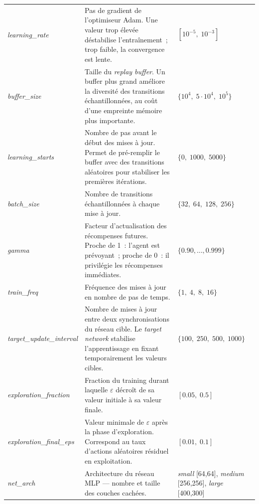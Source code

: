 \begin{longtable}{%
  p{\hpColA}%
  p{\dimexpr\textwidth - \hpColA - \hpColC - 6\tabcolsep\relax}%
  p{\hpColC}%
}
\textit{learning\_rate}
  & Pas de gradient de l'optimiseur Adam.
    Une valeur trop élevée déstabilise l'entraînement~; trop faible,
    la convergence est lente.
  & $[10^{-5},\;10^{-3}]$ \\[4pt]
\textit{buffer\_size}
  & Taille du \textit{replay buffer}.
    Un buffer plus grand améliore la diversité des transitions
    échantillonnées, au coût d'une empreinte mémoire plus importante.
  & $\{10^4,\;5{\cdot}10^4,\;10^5\}$ \\[4pt]
\textit{learning\_starts}
  & Nombre de pas avant le début des mises à jour.
    Permet de pré-remplir le buffer avec des transitions aléatoires
    pour stabiliser les premières itérations.
  & $\{0,\;1000,\;5000\}$ \\[4pt]
\textit{batch\_size}
  & Nombre de transitions échantillonnées à chaque mise à jour.
  & $\{32,\;64,\;128,\;256\}$ \\[4pt]
\textit{gamma}
  & Facteur d'actualisation des récompenses futures.
    Proche de 1~: l'agent est prévoyant~; proche de 0~: il privilégie
    les récompenses immédiates.
  & $\{0.90,\ldots,0.999\}$ \\[4pt]
\textit{train\_freq}
  & Fréquence des mises à jour en nombre de pas de temps.
  & $\{1,\;4,\;8,\;16\}$ \\[4pt]
\textit{target\_update\_interval}
  & Nombre de mises à jour entre deux synchronisations du réseau cible. Le \textit{target network} stabilise
    l'apprentissage en fixant temporairement les valeurs cibles.
  & $\{100,\;250,\;500,\;1000\}$ \\[4pt]
\textit{exploration\_fraction}
  & Fraction du training durant laquelle $\varepsilon$ décroît de sa
    valeur initiale à sa valeur finale.
  & $[0.05,\;0.5]$ \\[4pt]
\textit{exploration\_final\_eps}
  & Valeur minimale de $\varepsilon$ après la phase d'exploration. Correspond au taux d'actions aléatoires résiduel
    en exploitation.
  & $[0.01,\;0.1]$ \\[4pt]
\textit{net\_arch}
  & Architecture du réseau MLP --- nombre et taille des couches
    cachées.
  & \textit{small} [64,64],\newline
    \textit{medium} [256,256],\newline
    \textit{large} [400,300] \\
\end{longtable}
\endgroup

